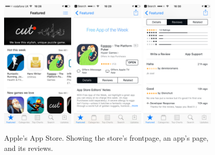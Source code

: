 \documentclass[thesis.tex]{subfiles}
\begin{document}
\begin{figure}
  \centering
  \includegraphics[width=0.31\textwidth]{figures/store-home.png}
  \includegraphics[width=0.31\textwidth]{figures/store-app.png}
  \includegraphics[width=0.31\textwidth]{figures/store-review.png}
  \caption[Apple's App Store.]{Apple's App Store.  Showing the store's frontpage, an app's page, and its reviews.}
  \label{fig:appstore}
\end{figure}
\end{document}
